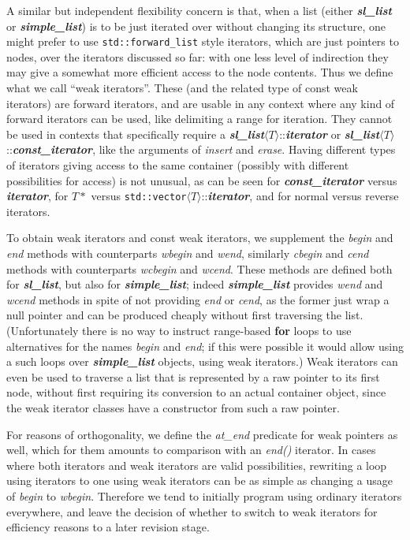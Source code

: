 \documentclass[12pt]{article}
\theoremstyle{plain}
\theoremstyle{definition}
\newcommand\std[1]{\texttt{std::#1}}
\def\frwl.{\std{forward\_list}}
\def\vect.{\std{vector}}
\def\slls.{\textbf{\textit{sl\_\!list}}}
\def\smpl.{\textbf{\textit{simple\_\!list}}}
\def\atend.{\textit{at\_\!end}}
\def\ang#1{\langle#1\rangle}
\def\atT{$\ang T$::}
\begin{document}
A similar but independent flexibility concern is that, when a list (either
\slls. or \smpl.) is to be just iterated over without changing its structure,
one might prefer to use \frwl. style iterators, which are just pointers to
nodes, over the iterators discussed so far: with one less level of indirection
they may give a somewhat more efficient access to the node contents. Thus we
define what we call ``weak iterators''. These (and the related type of const
weak iterators) are forward iterators, and are usable in any context where any
kind of forward iterators can be used, like delimiting a range for iteration.
They cannot be used in contexts that specifically require a
\slls.\atT\textit{\textbf{iterator}} or
\slls.\atT\textit{\textbf{const\_iterator}}, like the arguments of
\textit{insert} and \textit{erase}. Having different types of iterators giving
access to the same container (possibly with different possibilities for access)
is not unusual, as can be seen for \textit{\textbf{const\_iterator}} versus
\textit{\textbf{iterator}}, for $T*$ versus
\vect.\atT\textit{\textbf{iterator}}, and for normal versus reverse
iterators.

To obtain weak iterators and const weak iterators, we supplement the
\textit{begin} and \textit{end} methods with counterparts \textit{wbegin} and
\textit{wend}, similarly \textit{cbegin} and \textit{cend} methods with
counterparts \textit{wcbegin} and \textit{wcend}. These methods are defined both
for \slls., but also for \smpl.; indeed \smpl. provides \textit{wend} and
\textit{wcend} methods in spite of not providing \textit{end} or \textit{cend},
as the former just wrap a null pointer and can be produced cheaply without first
traversing the list. (Unfortunately there is no way to instruct range-based
\textbf{for} loops to use alternatives for the names \textit{begin} and
\textit{end}; if this were possible it would allow using a such loops over
\smpl. objects, using weak iterators.) Weak iterators can even be used to
traverse a list that is represented by a raw pointer to its first node, without
first requiring its conversion to an actual container object, since the weak
iterator classes have a constructor from such a raw pointer.

For reasons of orthogonality, we define the \atend. predicate for weak pointers
as well, which for them amounts to comparison with an \textit{end()} iterator.
In cases where both iterators and weak iterators are valid possibilities,
rewriting a loop using iterators to one using weak iterators can be as simple as
changing a usage of \textit{begin} to \textit{wbegin}. Therefore we tend to
initially program using ordinary iterators everywhere, and leave the
decision of whether to switch to weak iterators for efficiency reasons to a
later revision stage.
\end{document}
